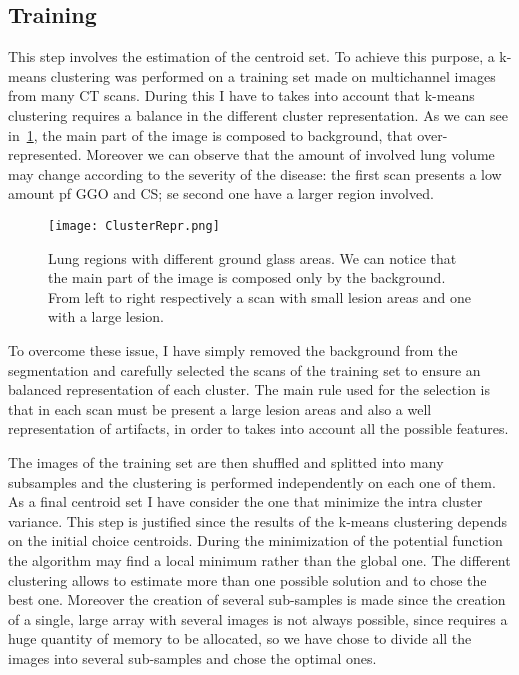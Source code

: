 \documentclass{standalone}
\begin{document}
	\subsection*{Training}
	
	This step involves the estimation of the centroid set. To achieve this purpose, a k-means clustering was performed on a training set made on multichannel images from many CT scans. During this I have to takes into account that k-means clustering requires a balance in the different cluster representation. As we can see in \figurename\,\ref{fig:ClusterRepr}, the main part of the image is composed to background, that over-represented. Moreover we can observe that the amount of involved lung volume may change according to the  severity of the disease: the first scan presents a low amount pf GGO and CS; se second one have a larger region involved. 
	\begin{figure}[h!]
		\centering
		\texttt{[image: ClusterRepr.png]}
		\caption{Lung regions with different ground glass areas. We can notice that the main part of the image is composed only by the background. From left to right respectively a scan with small lesion areas and one with a large lesion. }\label{fig:ClusterRepr}
	\end{figure}

	
	To overcome these issue, I have simply removed the background from the segmentation and carefully selected the scans of the training set to ensure an balanced representation of each cluster. The main rule used for the selection is that in each scan must be present a large lesion areas and also a well representation of artifacts, in order to takes into account all the possible features.
	
	The images of the training set are then shuffled and splitted into many subsamples and the clustering is performed independently on each one of them. As a final centroid set I have consider the one that minimize the intra cluster variance. This step is justified since the results of the k-means clustering depends on the initial choice centroids. During the minimization of the potential function the algorithm may find a local minimum rather than the global one. The different clustering allows to estimate more than one possible solution and to chose the best one. 		
	Moreover the creation of several sub-samples is made since the creation of a single, large array with several images is not always possible, since requires a huge quantity of memory to be allocated, so we have chose to divide all the images into several sub-samples and chose the optimal ones.
\end{document}
